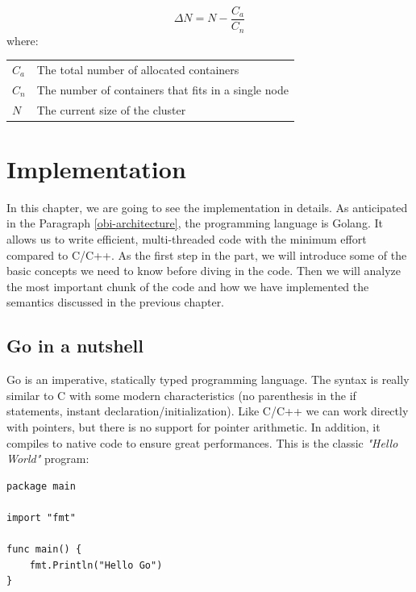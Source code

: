 \documentclass[12pt,twoside,cucitura]{toptesi}
\makeatletter
\newenvironment{conditions}
  {\par\vspace{\abovedisplayskip}\noindent\begin{tabular}{>{$}l<{$} @{${}={}$} l}}
  {\end{tabular}\par\vspace{\belowdisplayskip}}
\makeatother
\begin{document}
\begin{equation} \label{eq:downscaling_my}
\Delta N = N-\frac{C_{a}}{C_{n}}
\end{equation}
where:
\begin{conditions}
C_{a}    &  The total number of allocated containers \\  
C_{n}    &   The number of containers that fits in a single node \\
N & The current size of the cluster
\end{conditions}

\chapter{Implementation}
In this chapter, we are going to see the implementation in details. As anticipated in the Paragraph \ref{obi-architecture}, the programming language is Golang. It allows us to write efficient, multi-threaded code with the minimum effort compared to C/C++. As the first step in the part, we will introduce some of the basic concepts we need to know before diving in the code. Then we will analyze the most important chunk of the code and how we have implemented the semantics discussed in the previous chapter.


\section{Go in a nutshell}
Go is an imperative, statically typed programming language. The syntax is really similar to C with some modern characteristics (no parenthesis in the if statements, instant declaration/initialization). Like C/C++ we can work directly with pointers, but there is no support for pointer arithmetic. In addition, it compiles to native code to ensure great performances.  This is the classic \textit{"Hello World"} program:
\begin{lstlisting}
package main

import "fmt"

func main() {
    fmt.Println("Hello Go")
}
\end{lstlisting}
\end{document}
